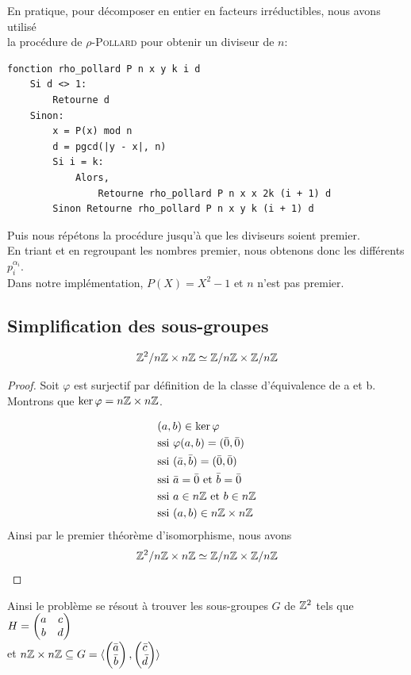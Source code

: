 \documentclass[12pt]{article}
\begin{document}
En pratique, pour décomposer en entier en facteurs irréductibles, nous avons utilisé\\
la procédure de \textsc{$\rho$-Pollard} pour obtenir un diviseur de $n$:
\begin{lstlisting}
fonction rho_pollard P n x y k i d
    Si d <> 1:
        Retourne d
    Sinon:
        x = P(x) mod n
        d = pgcd(|y - x|, n)
        Si i = k:
            Alors,
				Retourne rho_pollard P n x x 2k (i + 1) d
        Sinon Retourne rho_pollard P n x y k (i + 1) d
\end{lstlisting}
Puis nous répétons la procédure jusqu'à que les diviseurs soient premier.\\
En triant et en regroupant les nombres premier, nous obtenons donc les différents $p^{\alpha_i}_i$.\\
Dans notre implémentation, $P(X) = X^2 - 1$ et $n$ n'est pas premier.
\newpage
\subsection{Simplification des sous-groupes}\label{simp_ss_gr}

\begin{proposition}
	$$\mathbb Z^2/n\mathbb Z \times n\mathbb Z \simeq \mathbb Z/n\mathbb Z \times \mathbb Z/n\mathbb Z $$
\end{proposition}
\begin{proof}
	Soit 
	$\varphi$ est surjectif par définition de la classe d'équivalence de a et b.\\
	Montrons que $\ker \varphi = n\mathbb Z \times n\mathbb Z$.

	\begin{equation*}
		\begin{split}
			&(a,b) \in \ker \varphi \\
			&\text{ssi } \varphi(a,b) = (\bar 0, \bar 0)\\
			&\text{ssi } (\bar a, \bar b) = (\bar 0, \bar 0)\\
			&\text{ssi } \bar a = \bar 0 \text{ et } \bar b = \bar 0\\
			&\text{ssi } a \in n\mathbb Z \text{ et } b \in n\mathbb Z\\
			&\text{ssi } (a,b) \in  n\mathbb Z \times n\mathbb Z
		\end{split}
	\end{equation*}
	Ainsi par le premier théorème d'isomorphisme, nous avons
	$$\mathbb Z^2/n\mathbb Z \times n\mathbb Z \simeq \mathbb Z/n\mathbb Z \times \mathbb Z/n\mathbb Z $$
\end{proof}
Ainsi le problème se résout à trouver les sous-groupes $G$ de $\mathbb Z^2$ tels que
$H = \begin{pmatrix} a & c\\ b & d \end{pmatrix}$\\
et
$n\mathbb Z \times n\mathbb Z \subseteq G = \langle \begin{pmatrix} \bar a\\ \bar b \end{pmatrix}, \begin{pmatrix} \bar c\\ \bar d \end{pmatrix} \rangle$
\end{document}
